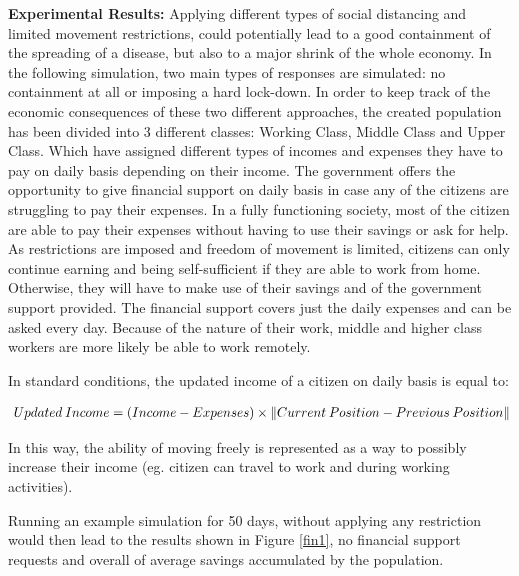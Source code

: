 \textbf{Experimental Results:} Applying different types of social distancing and limited movement restrictions, could potentially lead to a good containment of the spreading of a disease, but also to a major shrink of the whole economy. In the following simulation, two main types of responses are simulated: no containment at all or imposing a hard lock-down. In order to keep track of the economic consequences of these two different approaches, the created population has been divided into 3 different classes: Working Class, Middle Class and Upper Class. Which have assigned different types of incomes and expenses they have to pay on daily basis depending on their income. The government offers the opportunity to give financial support on daily basis in case any of the citizens are struggling to pay their expenses. In a fully functioning society, most of the citizen are able to pay their expenses without having to use their savings or ask for help. As restrictions are imposed and freedom of movement is limited, citizens can only continue earning and being self-sufficient if they are able to work from home. Otherwise, they will have to make use of their savings and of the government support provided. The financial support covers just the daily expenses and can be asked every day. Because of the nature of their work, middle and higher class workers are more likely be able to work remotely.

In standard conditions, the updated income of a citizen on daily basis is equal to:

\useshortskip
\begin{align}
\ Updated\:Income = (Income-Expenses)\times \norm{Current\:Position-Previous\:Position}
\end{align}
\useshortskip

In this way, the ability of moving freely is represented as a way to possibly increase their income (eg. citizen can travel to work and during working activities).

Running an example simulation for 50 days, without applying any restriction would then lead to the results shown in Figure \ref{fin1}, no financial support requests and overall  of average savings accumulated by the population.

